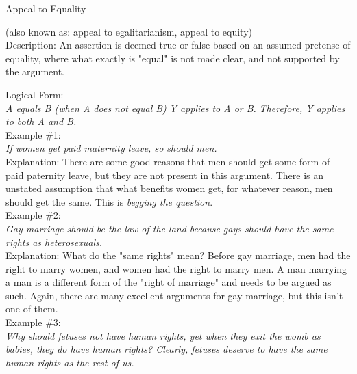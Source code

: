 \documentclass[a4paper,12pt,single,pdftex]{scrartcl}
\begin{document}
Appeal to Equality
    
      (also known as: appeal to egalitarianism, appeal to equity)
    \\

  
    Description: An assertion is deemed true or false based on an assumed pretense of equality, where what exactly is "equal" is not made clear, and not supported by the argument.

    
      Logical Form:
    \\

    
      {\em A equals B (when A does not equal B)} \newline
{\em Y applies to A or B.} \newline
{\em Therefore, Y applies to both A and B.}
    \\

    
      Example \#1:
    \\

    
      {\em If women get paid maternity leave, so should men.}
    \\

    
      Explanation: There are some good reasons that men should get some form of paid paternity leave, but they are not present in this argument. There is an unstated assumption that what benefits women get, for whatever reason, men should get the same. This is {\it begging the question}.
    \\

    
      Example \#2:
    \\

    
      {\em Gay marriage should be the law of the land because gays should have the same rights as heterosexuals.}
    \\

    
      Explanation: What do the "same rights" mean? Before gay marriage, men had the right to marry women, and women had the right to marry men. A man marrying a man is a different form of the "right of marriage" and needs to be argued as such. Again, there are many excellent arguments for gay marriage, but this isn't one of them.
    \\

    
      Example \#3:
    \\

    
      {\em Why should fetuses not have human rights, yet when they exit the womb as babies, they do have human rights? Clearly, fetuses deserve to have the same human rights as the rest of us.}
    \\
\end{document}
